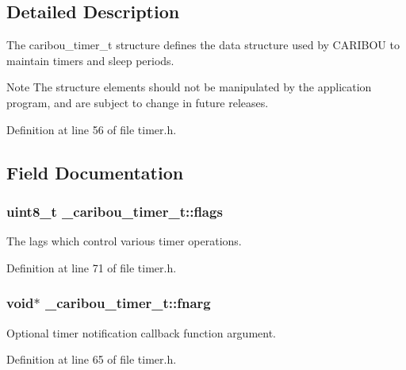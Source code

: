 \subsection{Detailed Description}
The caribou\-\_\-timer\-\_\-t structure defines the data structure used by C\-A\-R\-I\-B\-O\-U to maintain timers and sleep periods. 

\begin{DoxyNote}{Note}
The structure elements should not be manipulated by the application program, and are subject to change in future releases. 
\end{DoxyNote}


Definition at line 56 of file timer.\-h.



\subsection{Field Documentation}
\hypertarget{struct__caribou__timer__t_a492a012c1141298c40a781c09ca86aed}{
\subsubsection[{flags}]{\setlength{\rightskip}{0pt plus 5cm}uint8\-\_\-t \-\_\-caribou\-\_\-timer\-\_\-t\-::flags}}\label{struct__caribou__timer__t_a492a012c1141298c40a781c09ca86aed}


The lags which control various timer operations. 



Definition at line 71 of file timer.\-h.

\hypertarget{struct__caribou__timer__t_a9276b37ed4a76264b1f8570b678abe42}{
\subsubsection[{fnarg}]{\setlength{\rightskip}{0pt plus 5cm}void$\ast$ \-\_\-caribou\-\_\-timer\-\_\-t\-::fnarg}}\label{struct__caribou__timer__t_a9276b37ed4a76264b1f8570b678abe42}


Optional timer notification callback function argument. 



Definition at line 65 of file timer.\-h.

